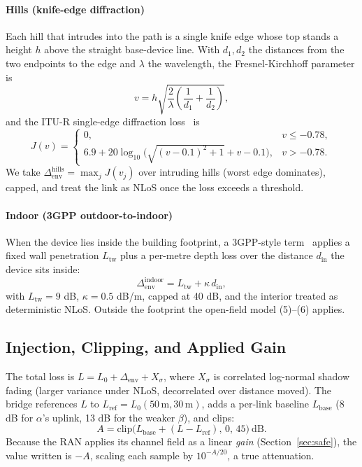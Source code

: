 \documentclass[conference]{IEEEtran}
\begin{document}
\paragraph{Hills (knife-edge diffraction)}
Each hill that intrudes into the path is a single knife edge whose top stands a height
$h$ above the straight base-device line. With $d_1,d_2$ the distances from the two
endpoints to the edge and $\lambda$ the wavelength, the Fresnel-Kirchhoff parameter is
\begin{equation}
v = h\sqrt{\frac{2}{\lambda}\!\left(\frac{1}{d_1}+\frac{1}{d_2}\right)},
\end{equation}
and the ITU-R single-edge diffraction loss~\cite{ituP526} is
\begin{equation}
J(v) =
\begin{cases}
0, & v \le -0.78,\\[2pt]
6.9 + 20\log_{10}\!\big(\sqrt{(v-0.1)^2+1} + v - 0.1\big), & v > -0.78.
\end{cases}
\end{equation}
We take $\Delta_{\mathrm{env}}^{\mathrm{hills}}=\max_j J(v_j)$ over intruding hills
(worst edge dominates), capped, and treat the link as NLoS once the loss exceeds a
threshold.

\paragraph{Indoor (3GPP outdoor-to-indoor)}
When the device lies inside the building footprint, a 3GPP-style
term~\cite{3gpp38901} applies a fixed wall penetration $L_{\mathrm{tw}}$ plus a
per-metre depth loss over the distance $d_{\mathrm{in}}$ the device sits inside:
\begin{equation}
\Delta_{\mathrm{env}}^{\mathrm{indoor}} = L_{\mathrm{tw}} + \kappa\, d_{\mathrm{in}},
\end{equation}
with $L_{\mathrm{tw}}=9$ dB, $\kappa=0.5$ dB/m, capped at 40 dB, and the interior
treated as deterministic NLoS. Outside the footprint the open-field model (5)--(6)
applies.

\subsection{Injection, Clipping, and Applied Gain}
The total loss is $L = L_0 + \Delta_{\mathrm{env}} + X_\sigma$, where $X_\sigma$ is
correlated log-normal shadow fading (larger variance under NLoS, decorrelated over
distance moved). The bridge references $L$ to $L_{\mathrm{ref}}=L_0(50\,\text{m},
30\,\text{m})$, adds a per-link baseline $L_{\mathrm{base}}$ (8 dB for $\alpha$'s
uplink, 13 dB for the weaker $\beta$), and clips:
\begin{equation}
A = \mathrm{clip}\big(L_{\mathrm{base}} + (L - L_{\mathrm{ref}}),\,0,\,45\big)\ \text{dB}.
\end{equation}
Because the RAN applies its channel field as a linear \emph{gain}
(Section~\ref{sec:safe}), the value written is $-A$, scaling each sample by
$10^{-A/20}$, a true attenuation.
\end{document}
